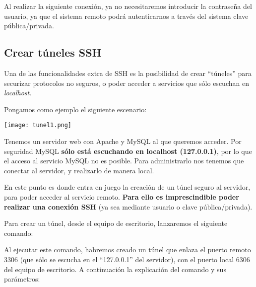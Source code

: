 
Al realizar la siguiente conexión, ya no necesitaremos introducir la contraseña del usuario, ya que el sistema remoto podrá autenticarnos a través del sistema clave pública/privada.


\subsection{Crear túneles SSH}
Una de las funcionalidades extra de SSH es la posibilidad de crear “túneles” para securizar protocolos no seguros, o poder acceder a servicios que sólo escuchan en \textit{localhost}.

Pongamos como ejemplo el siguiente escenario:

\vspace{-15pt}
\begin{center}
    \texttt{[image: tunel1.png]}
\end{center}
\vspace{-15pt}

Tenemos un servidor web con Apache y MySQL al que queremos acceder. Por seguridad MySQL \textbf{sólo está escuchando en localhost (127.0.0.1)}, por lo que el acceso al servicio MySQL no es posible. Para administrarlo nos tenemos que conectar al servidor, y realizarlo de manera local.

En este punto es donde entra en juego la creación de un túnel seguro al servidor, para poder acceder al servicio remoto. \textbf{Para ello es imprescindible poder realizar una conexión SSH} (ya sea mediante usuario o clave pública/privada).

Para crear un túnel, desde el equipo de escritorio, lanzaremos el siguiente comando:


Al ejecutar este comando, habremos creado un túnel que enlaza el puerto remoto 3306 (que sólo se escucha en el “127.0.0.1” del servidor), con el puerto local 6306 del equipo de escritorio. A continuación la explicación del comando y sus parámetros:


